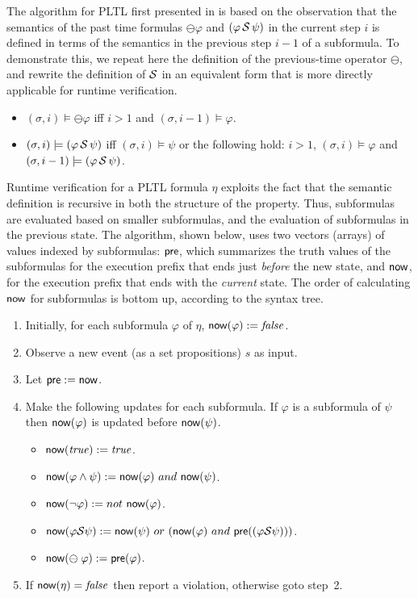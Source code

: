 The algorithm for PLTL first presented in \cite{HR} 
is based on the observation that the semantics of the 
past time formulas $\ominus \varphi$ and $(\varphi\, {\cal S} \,\psi)$ in the current step $i$ is defined in terms of the semantics
in the previous step $i - 1$ of a subformula.
To demonstrate this, we repeat here the definition of the previous-time
operator $\ominus$, and rewrite the definition
of ${\cal S}$ in an equivalent form that is
more directly applicable for runtime verification.
\begin{itemize}
\item $( \sigma , i) \models \ominus \varphi$ iff $i > 1$ and $(\sigma, i-1) \models \varphi$.
\item $(\sigma , i) \models (\varphi \, {\cal S} \, \psi)$ iff $(\sigma , i) \models \psi$ or the following hold: $i>1$,
$( \sigma , i)  \models \varphi$ and 
$(\sigma , i-1 ) \models ( \varphi \, {\cal S} \, \psi )$.
\end{itemize}
Runtime verification for a PLTL formula $\eta$ exploits the fact that
the semantic definition is recursive in both the structure of the property. Thus, subformulas
are evaluated based on smaller subformulas, and the
evaluation of subformulas in the previous state.
The algorithm, shown below, uses two vectors (arrays) of values indexed by subformulas:  $\mathsf{pre}$, which summarizes the truth values of the
subformulas for the execution prefix that
ends just {\em before} the new state, and $\mathsf{now}$, for the execution prefix that
ends with the {\em current} state. The order of calculating $\mathsf{now}$ for subformulas is bottom up, according to the syntax tree.
\begin{enumerate}
\item Initially, for each subformula $\varphi$
of $\eta$,
$\mathsf{now} ( \varphi ) := \mathit{false}$.

\item Observe a new event (as a set propositions) $s$ as input. 
\item Let $\mathsf{pre} := \mathsf{now}$.
\item Make the following updates for each subformula. If $\varphi$ is
      a subformula of $\psi$ then $\mathsf{now} ( \varphi )$ is updated before 
      $\mathsf{now} ( \psi )$.
\begin{itemize}
  \item $\mathsf{now} ( \mathit{true} ) := \mathit{true}$.
  \item $\mathsf{now} (  \varphi \wedge \psi  ) := 
  \mathsf{now} ( \varphi )\  and\ \mathsf{now} ( \psi )$.
  \item $\current ( \neg \varphi  ) := not\ \current ( \varphi )$.
  \item $\current (  \varphi \since \psi  ) :=  
  \current ( \psi  )\ or\ ( \current ( \varphi ) \ and\ 
      \old ( ( \varphi \since  \psi )))$.
  \item $\mathsf{now} ( \ominus \; \varphi ) := \mathsf{pre} ( \varphi )$.
\end{itemize}
\item If $\mathsf{now} (\eta) = \mathit{false}$ then
report a violation, otherwise goto step~2.
\end{enumerate}

